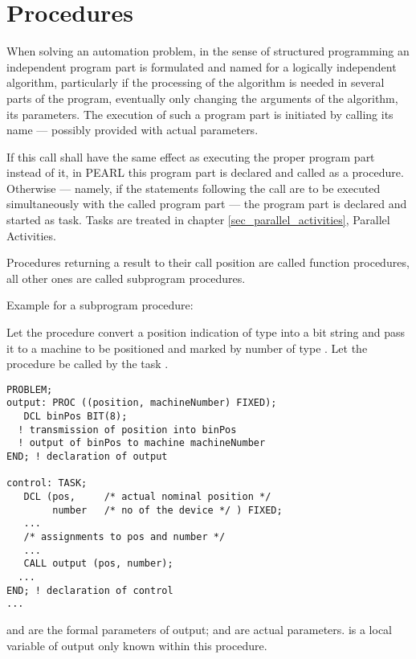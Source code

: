 \chapter{Procedures}   %

When solving an automation problem, in the sense of structured
programming an independent program part is formulated and named for a
logically independent algorithm, particularly if the processing of the
algorithm is needed in several parts of the program, eventually only
changing the arguments of the algorithm, its parameters. The execution
of such a program part is initiated by calling its name --- possibly
provided with actual parameters.

If this call shall have the same effect as executing the proper program
part instead of it, in PEARL this program part is declared and called
as a procedure. Otherwise --- namely, if the statements following the
call are to be executed simultaneously with the called program part ---
the program part is declared and started as task. Tasks are treated in
chapter \ref{sec_parallel_activities}, Parallel Activities.

Procedures returning a result to their call position are called function
procedures, all other ones are called subprogram procedures.

Example for a subprogram procedure:

Let the procedure  convert a position indication of type 
into a bit string  and pass it to a machine to be positioned and
marked by number  of type .
 Let the procedure  be called by
the task .

\begin{lstlisting}
PROBLEM;
output: PROC ((position, machineNumber) FIXED);
   DCL binPos BIT(8);
  ! transmission of position into binPos
  ! output of binPos to machine machineNumber
END; ! declaration of output

control: TASK;
   DCL (pos,     /* actual nominal position */ 
        number   /* no of the device */ ) FIXED;
   ... 
   /* assignments to pos and number */ 
   ...
   CALL output (pos, number); 
  ... 
END; ! declaration of control 
...
\end{lstlisting}

 and  are the formal parameters of
 output;  and 
are actual parameters.  is a local variable of output only known
within this procedure.

